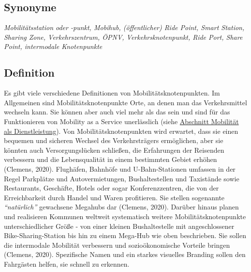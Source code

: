 \documentclass[
]{book}
\begin{document}
\hypertarget{synonyme-22}{%
\subsection*{Synonyme}\label{synonyme-22}}

\emph{Mobilitätsstation oder -punkt, Mobihub, (öffentlicher) Ride Point, Smart Station, Sharing Zone, Verkehrszentrum, ÖPNV, Verkehrsknotenpunkt, Ride Port, Share Point, intermodale Knotenpunkte}

\hypertarget{definition-28}{%
\subsection*{Definition}\label{definition-28}}

Es gibt viele verschiedene Definitionen von Mobilitätsknotenpunkten. Im Allgemeinen sind Mobilitätsknotenpunkte Orte, an denen man das Verkehrsmittel wechseln kann. Sie können aber auch viel mehr als das sein und sind für das Funktionieren von Mobility as a Service unerlässlich (siehe \protect\hyperlink{maas}{Abschnitt Mobilität als Dienstleistung}). Von Mobilitätsknotenpunkten wird erwartet, dass sie einen bequemen und sicheren Wechsel des Verkehrsträgers ermöglichen, aber sie könnten auch Versorgungslücken schließen, die Erfahrungen der Reisenden verbessern und die Lebensqualität in einem bestimmten Gebiet erhöhen (Clemens, 2020). Flughäfen, Bahnhöfe und U-Bahn-Stationen umfassen in der Regel Parkplätze und Autovermietungen, Bushaltestellen und Taxistände sowie Restaurants, Geschäfte, Hotels oder sogar Konferenzzentren, die von der Erreichbarkeit durch Handel und Waren profitieren. Sie stellen sogenannte \emph{``natürlich''} gewachsene Megahubs dar (Clemens, 2020). Darüber hinaus planen und realisieren Kommunen weltweit systematisch weitere Mobilitätsknotenpunkte unterschiedlicher Größe - von einer kleinen Bushaltestelle mit angeschlossener Bike-Sharing-Station bis hin zu einem Mega-Hub wie oben beschrieben. Sie sollen die intermodale Mobilität verbessern und sozioökonomische Vorteile bringen (Clemens, 2020). Spezifische Namen und ein starkes visuelles Branding sollen den Fahrgästen helfen, sie schnell zu erkennen.
\end{document}

